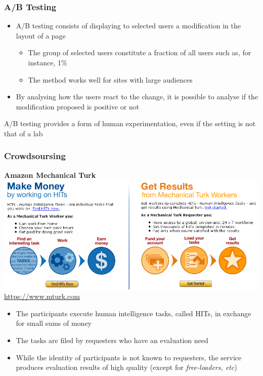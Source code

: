 \documentclass[svgnames]{beamer}
\begin{document}
\begin{frame}
  \frametitle{A/B Testing}

\begin{itemize}
\item A/B testing consists of displaying to selected users a modification in the layout of a page
\begin{itemize}
  \item The group of selected users constitute a fraction of all users such as, for instance, 1\%
  \item The method works well for sites with large audiences
\end{itemize}
\item By analysing how the users react to the change, it is possible to analyse if the modification proposed is positive or not
\end{itemize}

\begin{block}{} 
A/B testing provides a form of human experimentation, even if the setting is not that of a lab
\end{block}

\end{frame}


\begin{frame}
  \frametitle{Crowdsoursing}

\centering
\textbf{Amazon Mechanical Turk}
\includegraphics[width=0.8 \textwidth]{Amazon-Mechanical-Turk}\\
{\small \url{https://www.mturk.com}}

\begin{itemize}
    \small
\item The participants execute human intelligence tasks, called HITs, in exchange for small sums of money
\item The tasks are filed by requesters who have an evaluation need
\item While the identity of participants is not known to requesters,
  the service produces evaluation results of high quality (except for \emph{free-loaders, etc})
\end{itemize}

\end{frame}
\end{document}
